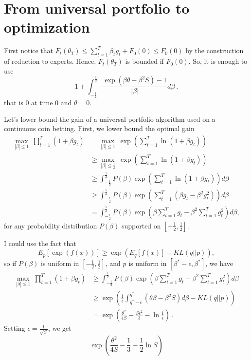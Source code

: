 \documentclass{colt2016_empty} %
\begin{document}
\section{From universal portfolio to optimization}

First notice that $F_t(\theta_T) \leq \sum_{t=1}^T \beta_t g_t + F_0(0)\leq F_0(0)$ by the construction of reduction to experts. Hence, $F_t(\theta_T)$ is bounded if $F_0(0)$. So, it is enough to use
\[
1+\int_{-\frac{1}{2}}^{\frac{1}{2}} \frac{\exp\left(\beta \theta - \beta^2 S \right)-1}{|\beta|} d \beta~.
\]
that is 0 at time 0 and $\theta=0$.

Let's lower bound the gain of a universal portfolio algorithm used on a continuous coin betting.
First, we lower bound the optimal gain
\begin{align}
\max_{|\beta|\leq 1} \ \prod_{t=1}^T (1+\beta g_t) 
&= \max_{|\beta|\leq 1} \ \exp\left(\sum_{t=1}^T \ln (1+\beta g_t) \right) \\
&\geq \max_{|\beta|\leq \frac{1}{2}} \ \exp\left(\sum_{t=1}^T \ln (1+\beta g_t) \right) \\
&\geq \int_{-\frac{1}{2}}^{\frac{1}{2}} P(\beta) \exp\left(\sum_{t=1}^T \ln (1+\beta g_t) \right) d \beta \\
&\geq \int_{-\frac{1}{2}}^{\frac{1}{2}} P(\beta) \exp\left(\sum_{t=1}^T (\beta g_t - \beta^2 g_t^2) \right) d \beta \\
&= \int_{-\frac{1}{2}}^{\frac{1}{2}} P(\beta) \exp\left(\beta \sum_{t=1}^T g_t - \beta^2 \sum_{t=1}^T g_t^2 \right) d \beta,
\end{align}
for any probability distribution $P(\beta)$ supported on $[-\tfrac{1}{2},\tfrac{1}{2}]$.

I could use the fact that
\[
E_p[\exp(f(x))] \geq \exp\left(E_q[f(x)] - KL(q||p)\right),
\]
so if $P(\beta)$ is uniform in $[-\tfrac{1}{2},\tfrac{1}{2}]$, and $p$ is uniform in $[\beta^*-\epsilon,\beta^*]$, we have
\begin{align}
\max_{|\beta|\leq 1} \ \prod_{t=1}^T (1+\beta g_t) 
&\geq \int_{-\frac{1}{2}}^{\frac{1}{2}} P(\beta) \exp\left(\beta \sum_{t=1}^T g_t - \beta^2 \sum_{t=1}^T g_t^2 \right) d \beta \\
&\geq \exp\left(\frac{1}{\epsilon}\int_{\eta^*-\epsilon}^{\eta^*} (\theta \beta - \beta^2 S) d \beta - KL(q||p)\right) \\
&= \exp\left(\frac{\theta^2}{4 S} - \frac{S \epsilon^2}{3} - \ln\frac{1}{\epsilon}\right)~.
\end{align}
Setting $\epsilon=\tfrac{1}{\sqrt{S}}$, we get 
\[
\exp\left(\frac{\theta^2}{4 S} - \frac{1}{3} - \frac{1}{2}\ln S\right)
\]
\end{document}
